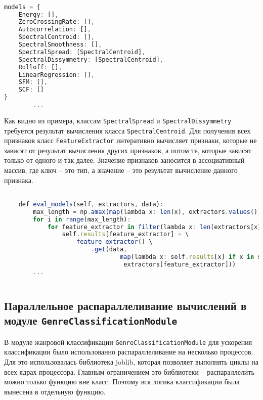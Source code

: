 \begin{lstlisting}[language=TypeScript, label=lst:graph]

models = {
    Energy: [],
    ZeroCrossingRate: [],
    Autocorrelation: [],
    SpectralCentroid: [],
    SpectralSmoothness: [],
    SpectralSpread: [SpectralCentroid],
    SpectralDissymmetry: [SpectralCentroid],
    Rolloff: [],
    LinearRegression: [],
    SFM: [],
    SCF: []
}
        ...
\end{lstlisting}

Как видно из примера, классам \texttt{SpectralSpread} и  \texttt{SpectralDissymmetry} требуется результат вычисления класса \texttt{SpectralCentroid}. Для получения всех признаков  класс \texttt{FeatureExtractor} интеративно вычисляет признаки, которые не зависят от результат вычисления других признаков, а потом те, которые зависят только от одного и так далее. Значение признаков заносится в ассоциативный массив, где ключ -- это тип, а значение -- это результат вычисление данного признака.

\begin{lstlisting}[language=TypeScript, label=lst:evalgraph]

    def eval_models(self, extractors, data):
        max_length = np.amax(map(lambda x: len(x), extractors.values())) + 1)
        for i in range(max_length):
            for feature_extractor in filter(lambda x: len(extractors[x]) == i, extractors):
                self.results[feature_extractor] = \
                    feature_extractor() \
                        .get(data,
                                map(lambda x: self.results[x] if x in self.results else None,
                                 extractors[feature_extractor]))
        ...
        
\end{lstlisting}

\subsection{Параллельное распараллеливание вычислений в модуле \texttt{GenreClassificationModule}}

В модуле жанровой классификации \texttt{GenreClassificationModule} для ускорения классификации было использованно распараллеливание на несколько процессов. Для это использовалась библиотека joblib, которая позволяет выполнять циклы на всех ядрах процессора. Главным ограничением это библиотеки -- распараллелить можно только функцию вне класс. Поэтому вся логика классификации была вынесена в отдельную функцию. 

